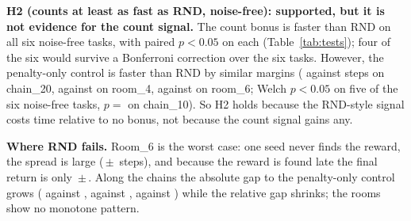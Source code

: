 \textbf{H2 (counts at least as fast as RND, noise-free): supported, but it is not evidence for the count signal.} The count bonus is faster than RND on all six noise-free tasks, with paired $p<0.05$ on each (Table~\ref{tab:tests}); four of the six would survive a Bonferroni correction over the six tasks. However, the penalty-only control is faster than RND by similar margins ( against  steps on chain\_20,  against  on room\_4,  against  on room\_6; Welch $p<0.05$ on five of the six noise-free tasks, $p={}$ on chain\_10). So H2 holds because the RND-style signal costs time relative to no bonus, not because the count signal gains any.

\textbf{Where RND fails.} Room\_6 is the worst case: one seed never finds the reward, the spread is large (\,$\pm$\, steps), and because the reward is found late the final return is only \,$\pm$\,. Along the chains the absolute gap to the penalty-only control grows ( against ,  against ,  against ) while the relative gap shrinks; the rooms show no monotone pattern.

\begin{table}[!tb]\centering\caption{TV tasks: share of steps on the TV cell (mean $\pm$ std), and mean steps to first reward on the noise-free twin (``twin'') and on the TV task (``TV''), over 5 seeds.}\label{tab:tv}{\footnotesize\setlength{\tabcolsep}{4pt}}\end{table}

